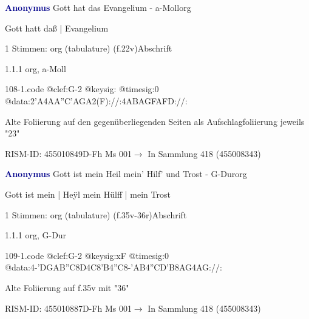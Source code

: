 \documentclass[twocolumn, 12pt]{book}
\begin{document}
\par \vspace{16pt} \textcolor{darkblue}{\textbf{Anonymus  }}\hfillplus{\textbf{[108]}}\newline Gott hat das Evangelium - a-Moll\newline org
\par \begin{itshape}[f.22v, at left:] Gott hatt daß | Evangelium\end{itshape} 
\par \textcolor{darkblue}{}  1 Stimmen: org (tabulature)  (f.22v)\newline Abschrift
\par 1.1.1  org, a-Moll  
\begin{filecontents*}{108-1.code}
@clef:G-2
@keysig:
@timesig:0
@data:2'A4AA''C'AGA2(F)://:4ABAGFAFD://:
\end{filecontents*}
\newline %
\par Alte Foliierung auf den gegenüberliegenden Seiten als Aufschlagfoliierung jeweils "23"
\par RISM-ID: 455010849\newline D-Fh  Ms 001\newline $\rightarrow$ In Sammlung 418 (455008343)
      
\par \vspace{16pt} \textcolor{darkblue}{\textbf{Anonymus  }}\hfillplus{\textbf{[109]}}\newline Gott ist mein Heil mein' Hilf' und Trost - G-Dur\newline org
\par \begin{itshape}[f.35v, at left:] Gott ist mein | Heÿl mein Hülff | mein Trost\end{itshape} 
\par \textcolor{darkblue}{}  1 Stimmen: org (tabulature)  (f.35v-36r)\newline Abschrift
\par 1.1.1  org, G-Dur  
\begin{filecontents*}{109-1.code}
@clef:G-2
@keysig:xF
@timesig:0
@data:4-'DGAB''C8D4C8'B4''C8-'AB4''CD'B{8AG}4AG://:
\end{filecontents*}
\newline %
\par Alte Foliierung auf f.35v mit "36"
\par RISM-ID: 455010887\newline D-Fh  Ms 001\newline $\rightarrow$ In Sammlung 418 (455008343)
      
\end{document}

